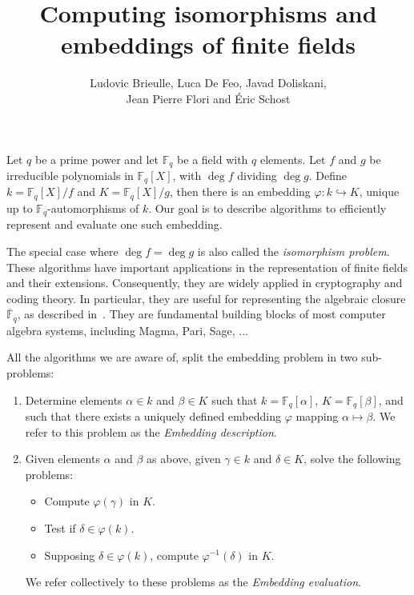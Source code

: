 \documentclass{article}
\title{Computing isomorphisms and embeddings of finite fields}
\author{Ludovic Brieulle, Luca De Feo, Javad Doliskani,\\ Jean Pierre
  Flori and Éric Schost}
\def\F {\ensuremath{\mathbb{F}}}
\begin{document}
\maketitle

Let $q$ be a prime power and let $\F_q$ be a field with $q$
elements. Let $f$ and $g$ be irreducible polynomials in $\F_q[X]$,
with $\deg f$ dividing $\deg g$. Define $k=\F_q[X]/f$ and
$K=\F_q[X]/g$, then there is an embedding $\varphi:k\hookrightarrow
K$, unique up to \mbox{$\F_q$-auto}morphisms of $k$. Our goal is to
describe algorithms to efficiently represent and evaluate one such
embedding.

The special case where $\deg f = \deg g$ is also called the
\emph{isomorphism problem}. These algorithms have important
applications in the representation of finite fields and their
extensions. Consequently, they are widely applied in cryptography and
coding theory. In particular, they are useful for representing the
algebraic closure $\bar{\F}_q$, as described
in~\cite{bosma+cannon+steel97}. They are fundamental building blocks
of most computer algebra systems, including Magma\cite{MAGMA},
Pari\cite{Pari}, Sage\cite{Sage}, ...

All the algorithms we are aware of, split the embedding problem in two
sub-problems:
\begin{enumerate}
\item Determine elements $\alpha\in k$ and $\beta\in K$ such that
  $k=\F_q[\alpha]$, $K=\F_q[\beta]$, and such that there exists a
  uniquely defined embedding $\varphi$ mapping
  $\alpha\mapsto\beta$. We refer to this problem as the
  \emph{Embedding description}.
\item Given elements $\alpha$ and $\beta$ as above, given $\gamma\in
  k$ and $\delta\in K$, solve the following problems:
  \begin{itemize}
  \item Compute $\varphi(\gamma)$ in $K$.
  \item Test if $\delta\in\varphi(k)$.
  \item Supposing $\delta\in\varphi(k)$, compute $\varphi^{-1}(\delta)$ in $K$.
  \end{itemize}
  We refer collectively to these problems as the \emph{Embedding
    evaluation}.
\end{enumerate}
\end{document}
